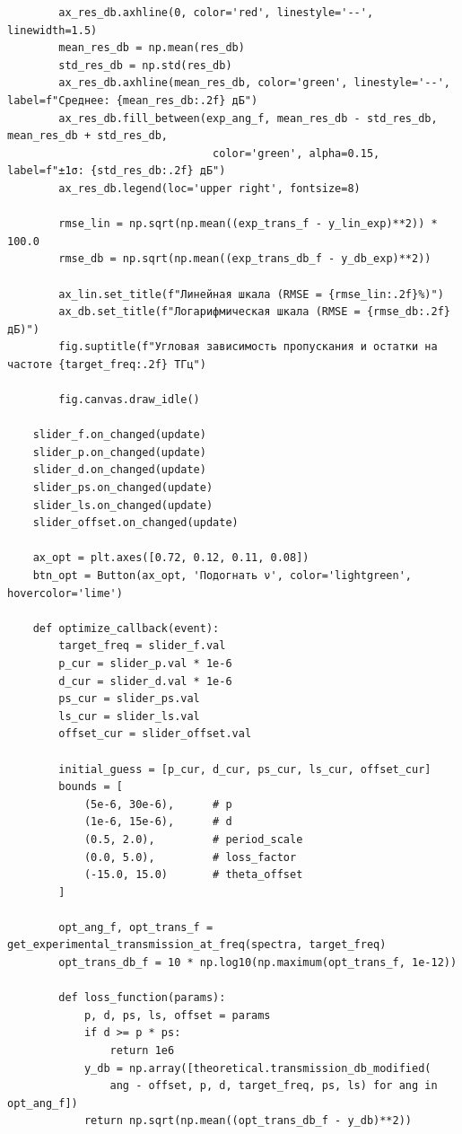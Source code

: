 \begin{verbatim}
        ax_res_db.axhline(0, color='red', linestyle='--', linewidth=1.5)
        mean_res_db = np.mean(res_db)
        std_res_db = np.std(res_db)
        ax_res_db.axhline(mean_res_db, color='green', linestyle='--', label=f"Среднее: {mean_res_db:.2f} дБ")
        ax_res_db.fill_between(exp_ang_f, mean_res_db - std_res_db, mean_res_db + std_res_db,
                                color='green', alpha=0.15, label=f"±1σ: {std_res_db:.2f} дБ")
        ax_res_db.legend(loc='upper right', fontsize=8)
        
        rmse_lin = np.sqrt(np.mean((exp_trans_f - y_lin_exp)**2)) * 100.0
        rmse_db = np.sqrt(np.mean((exp_trans_db_f - y_db_exp)**2))
        
        ax_lin.set_title(f"Линейная шкала (RMSE = {rmse_lin:.2f}%)")
        ax_db.set_title(f"Логарифмическая шкала (RMSE = {rmse_db:.2f} дБ)")
        fig.suptitle(f"Угловая зависимость пропускания и остатки на частоте {target_freq:.2f} ТГц")
        
        fig.canvas.draw_idle()
        
    slider_f.on_changed(update)
    slider_p.on_changed(update)
    slider_d.on_changed(update)
    slider_ps.on_changed(update)
    slider_ls.on_changed(update)
    slider_offset.on_changed(update)
    
    ax_opt = plt.axes([0.72, 0.12, 0.11, 0.08])
    btn_opt = Button(ax_opt, 'Подогнать ν', color='lightgreen', hovercolor='lime')
    
    def optimize_callback(event):
        target_freq = slider_f.val
        p_cur = slider_p.val * 1e-6
        d_cur = slider_d.val * 1e-6
        ps_cur = slider_ps.val
        ls_cur = slider_ls.val
        offset_cur = slider_offset.val
        
        initial_guess = [p_cur, d_cur, ps_cur, ls_cur, offset_cur]
        bounds = [
            (5e-6, 30e-6),      # p
            (1e-6, 15e-6),      # d
            (0.5, 2.0),         # period_scale
            (0.0, 5.0),         # loss_factor
            (-15.0, 15.0)       # theta_offset
        ]
        
        opt_ang_f, opt_trans_f = get_experimental_transmission_at_freq(spectra, target_freq)
        opt_trans_db_f = 10 * np.log10(np.maximum(opt_trans_f, 1e-12))
        
        def loss_function(params):
            p, d, ps, ls, offset = params
            if d >= p * ps:
                return 1e6
            y_db = np.array([theoretical.transmission_db_modified(
                ang - offset, p, d, target_freq, ps, ls) for ang in opt_ang_f])
            return np.sqrt(np.mean((opt_trans_db_f - y_db)**2))
            

\end{verbatim}
